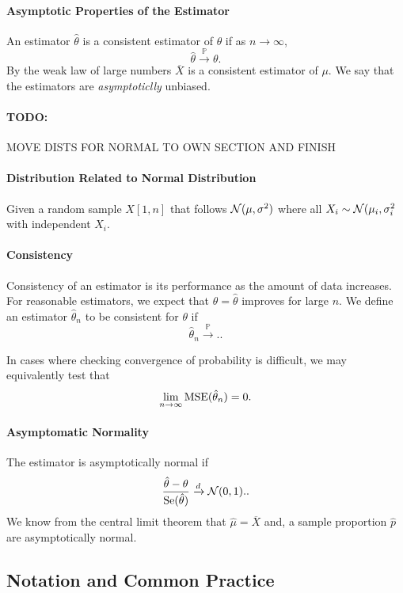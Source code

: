 \paragraph{Asymptotic Properties of the Estimator}
An estimator \(\hat{\theta}\) is a consistent estimator of \(\theta\) if as
\(n \to  \infty\), \[
  \hat{\theta} \xrightarrow{\mathbb{P}} \theta
.\] 
By the weak law of large numbers \(\overline{X}\) is a consistent estimator of \(\mu\).
We say that the estimators are \textit{asymptoticlly} unbiased.

\paragraph{TODO:} MOVE DISTS FOR NORMAL TO OWN SECTION AND FINISH

\paragraph{Distribution Related to Normal Distribution}
Given a random sample \(X[1, n]\) that follows  \(\mathcal{N}(\mu, \sigma^2)\)
where all \(X_i \sim \mathcal{N}(\mu_i, \sigma_i^2\) with independent \(X_i\).

\paragraph{Consistency}
Consistency of an estimator is its performance as the amount of data increases.
For reasonable estimators, we expect that \(\theta = \hat{\theta}\) improves for large \(n\).
We define an estimator \(\hat{\theta}_n\) to be consistent for \(\theta\)
if \[
  \hat{\theta}_n \xrightarrow{\mathbb{P}}.
.\] 

In cases where checking convergence of probability is difficult, we may equivalently test
that \[
  \lim_{n \to \infty} \mathrm{MSE}(\hat{\theta}_n) = 0
.\] 

\paragraph{Asymptomatic Normality}
The estimator is asymptotically normal if  \[
  \frac{\hat{\theta} - \theta}{\mathrm{Se}(\hat{\theta})} \xrightarrow{d} \mathcal{N}(0,1).
.\] 
We know from the central limit theorem that \(\hat{\mu} = \overline{X}\) and,
a sample proportion \(\hat{p}\) are asymptotically normal.

\subsection{Notation and Common Practice}

